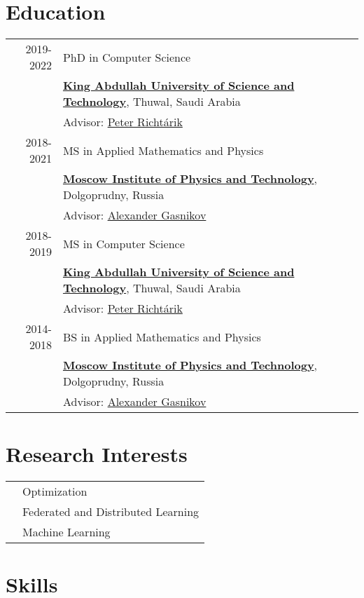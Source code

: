 \section{Education}
\begin{tabular}{rl}	
	\textsc{2019-2022}& PhD in Computer Science\\
	& \textbf{\href{https://www.kaust.edu.sa/en}{\color{black}King Abdullah University of Science and Technology}}, Thuwal, Saudi Arabia\\
	& Advisor: \href{https://richtarik.org}{Peter Richt\'{a}rik}\\
	\textsc{2018-2021}& MS in Applied Mathematics and Physics\\
	& \textbf{\href{https://mipt.ru/}{\color{black}Moscow Institute of Physics and Technology}}, Dolgoprudny, Russia\\
	& Advisor: \href{https://scholar.google.com/citations?user=AmeE8qkAAAAJ}{Alexander Gasnikov}\\
	\textsc{2018-2019}& MS in Computer Science\\
	& \textbf{\href{https://www.kaust.edu.sa/en}{\color{black}King Abdullah University of Science and Technology}}, Thuwal, Saudi Arabia\\
	& Advisor: \href{https://richtarik.org}{Peter Richt\'{a}rik}\\
	\textsc{2014-2018}& BS in Applied Mathematics and Physics\\
	& \textbf{\href{https://mipt.ru/}{\color{black}Moscow Institute of Physics and Technology}}, Dolgoprudny, Russia\\
	& Advisor: \href{https://scholar.google.com/citations?user=AmeE8qkAAAAJ}{Alexander Gasnikov}\\
\end{tabular}

\section{Research Interests}
\begin{tabular}{cl}
	&  Optimization\\
	& Federated and Distributed Learning\\
	&  Machine Learning
\end{tabular}

\section{Skills}

